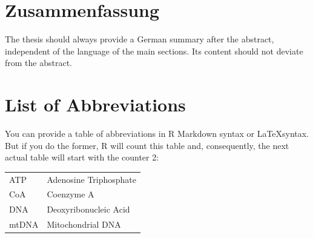 \documentclass[a4paper,12pt]{article}
\begin{document}
\newpage
\hypertarget{zusammenfassung}{%
\section*{Zusammenfassung}\label{zusammenfassung}}

The thesis should always provide a German summary after the abstract, independent of the language of the main sections. Its content should not deviate from the abstract.

\newpage
\renewcommand{\contentsname}{Table of Content}
\tableofcontents
\clearpage

\newpage
\hypertarget{list-of-abbreviations}{%
\section*{List of Abbreviations}\label{list-of-abbreviations}}

You can provide a table of abbreviations in R Markdown syntax or \LaTeX syntax. But if you do the former, R will count this table and, consequently, the next actual table will start with the counter 2:

\vspace{1cm}
\begin{tabular}{*2{l}}
    ATP  &  Adenosine Triphosphate   \\ 
    CoA  &  Coenzyme A  \\
    DNA  &  Deoxyribonucleic Acid \\         
    mtDNA  &  Mitochondrial DNA \\
\end{tabular}
\newpage
\listoffigures
{}

\newpage
\listoftables
{}
\end{document}
